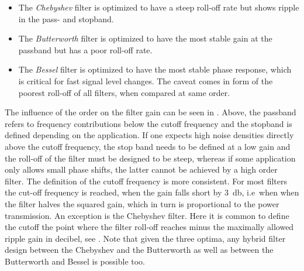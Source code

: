 \begin{itemize}
  \item The \emph{Chebyshev} filter is optimized to have a steep roll-off rate but shows ripple in the pass- and stopband.
  \item The \emph{Butterworth} filter is optimized to have the most stable gain at the passband but has a poor roll-off rate.
  \item The \emph{Bessel} filter is optimized to have the most stable phase response, which is critical for fast signal level changes. The caveat comes in form of the poorest roll-off of all filters, when compared at same order.
\end{itemize}

The influence of the order on the filter gain can be seen in . Above, the passband refers to frequency contributions below the cutoff frequency and the stopband is defined depending on the application. If one expects high noise densities directly above the cutoff frequency, the stop band needs to be defined at a low gain and the roll-off of the filter must be designed to be steep, whereas if some application only allows small phase shifts, the latter cannot be achieved by a high order filter. The definition of the cutoff frequency is more consistent. For most filters the cut-off frequency is reached, when the gain falls short by \SI{3}{\decibel}, i.e\ when when the filter halves the squared gain, which in turn is proportional to the power transmission. An exception is the Chebyshev filter. Here it is common to define the cutoff the point where the filter roll-off reaches minus the maximally allowed ripple gain in decibel, see .
Note that given the three optima, any hybrid filter design between the Chebyshev and the Butterworth as well as between the Butterworth and Bessel is possible too.

